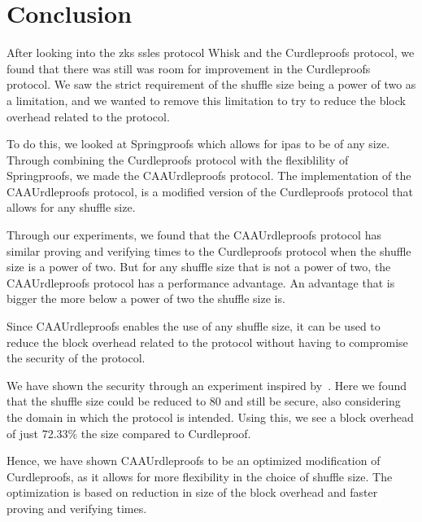 

\section{Conclusion}\label{sec:conclusion}
After looking into the \glspl{zk} \glspl{ssle} protocol Whisk and the Curdleproofs protocol, we found that there was still was room for improvement in the Curdleproofs protocol.
We saw the strict requirement of the shuffle size being a power of two as a limitation, and we wanted to remove this limitation to try to reduce the block overhead related to the protocol.

To do this, we looked at Springproofs which allows for \glspl{ipa} to be of any size.
Through combining the Curdleproofs protocol with the flexiblility of Springproofs, we made the CAAUrdleproofs protocol.
The implementation of the CAAUrdleproofs protocol, is a modified version of the Curdleproofs protocol that allows for any shuffle size.

Through our experiments, we found that the CAAUrdleproofs protocol has similar proving and verifying times to the Curdleproofs protocol when the shuffle size is a power of two.
But for any shuffle size that is not a power of two, the CAAUrdleproofs protocol has a performance advantage. 
An advantage that is bigger the more below a power of two the shuffle size is.

Since CAAUrdleproofs enables the use of any shuffle size, it can be used to reduce the block overhead related to the protocol without having to compromise the security of the protocol.

We have shown the security through an experiment inspired by~\cite{cryptoeprint:2022/560}.
Here we found that the shuffle size could be reduced to 80 and still be secure, also considering the domain in which the protocol is intended.
Using this, we see a block overhead of just 72.33\% the size compared to Curdleproof.
 

Hence, we have shown CAAUrdleproofs to be an optimized modification of Curdleproofs, as it allows for more flexibility in the choice of shuffle size. 
The optimization is based on reduction in size of the block overhead and faster proving and verifying times.
